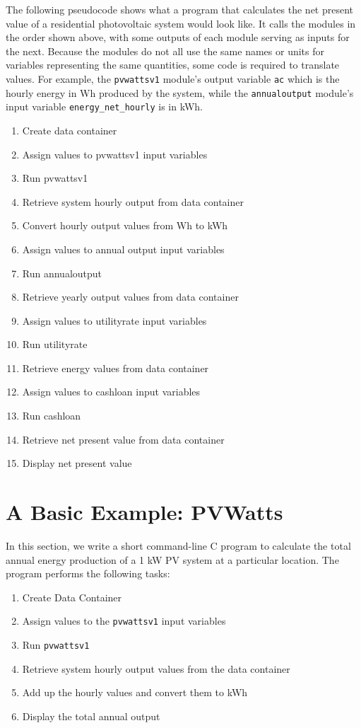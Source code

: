 \documentclass{scrartcl} %
\begin{document}
The following pseudocode shows what a program that calculates the net present value of a residential photovoltaic system would look like. It calls the modules in the order shown above, with some outputs of each module serving as inputs for the next. Because the modules do not all use the same names or units for variables representing the same quantities, some code is required to translate values. For example, the \texttt{pvwattsv1} module's output variable \texttt{ac} which is the hourly energy in Wh produced by the system, while the \texttt{annualoutput} module's input variable \texttt{energy\_net\_hourly} is in kWh.

\begin{enumerate}
\item Create data container
\item Assign values to pvwattsv1 input variables
\item Run pvwattsv1
\item Retrieve system hourly output from data container
\item Convert hourly output values from Wh to kWh
\item Assign values to annual output input variables
\item Run annualoutput
\item Retrieve yearly output values from data container
\item Assign values to utilityrate input variables
\item Run utilityrate
\item Retrieve energy values from data container
\item Assign values to cashloan input variables
\item Run cashloan
\item Retrieve net present value from data container
\item Display net present value
\end{enumerate}

\section{A Basic Example: PVWatts}
\label{sec_pvwatts_example}

In this section, we write a short command-line C program to calculate the total annual energy production of a 1 kW PV system at a particular location. The program performs the following tasks:

\begin{enumerate}
\item Create Data Container
\item Assign values to the \texttt{pvwattsv1} input variables
\item Run \texttt{pvwattsv1}
\item Retrieve system hourly output values from the data container
\item Add up the hourly values and convert them to kWh
\item Display the total annual output
\end{enumerate}
\end{document}
